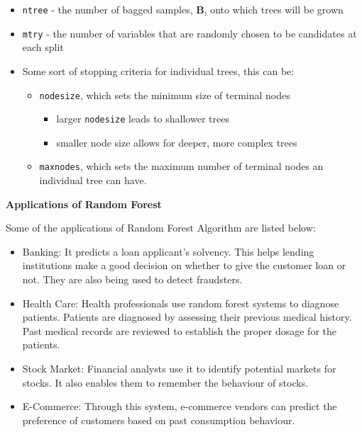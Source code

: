 \documentclass[
]{book}
\providecommand{\tightlist}{%
  \setlength{\itemsep}{0pt}\setlength{\parskip}{0pt}}
\theoremstyle{definition}
\theoremstyle{definition}
\theoremstyle{definition}
\theoremstyle{definition}
\theoremstyle{remark}
\begin{document}
\begin{itemize}
\tightlist
\item
  \texttt{ntree} - the number of bagged samples, \(\boldsymbol{B}\), onto which trees will be grown
\item
  \texttt{mtry} - the number of variables that are randomly chosen to be candidates at each split
\item
  Some sort of stopping criteria for individual trees, this can be:

  \begin{itemize}
  \tightlist
  \item
    \texttt{nodesize}, which sets the minimum size of terminal nodes

    \begin{itemize}
    \tightlist
    \item
      larger \texttt{nodesize} leads to shallower trees
    \item
      smaller node size allows for deeper, more complex trees
    \end{itemize}
  \item
    \texttt{maxnodes}, which sets the maximum number of terminal nodes an individual tree can have.
  \end{itemize}
\end{itemize}

\textbf{Applications of Random Forest}

Some of the applications of Random Forest Algorithm are listed below:

\begin{itemize}
\tightlist
\item
  Banking: It predicts a loan applicant's solvency. This helps lending institutions make a good decision on whether to give the customer loan or not. They are also being used to detect fraudsters.
\item
  Health Care: Health professionals use random forest systems to diagnose patients. Patients are diagnosed by assessing their previous medical history. Past medical records are reviewed to establish the proper dosage for the patients.
\item
  Stock Market: Financial analysts use it to identify potential markets for stocks. It also enables them to remember the behaviour of stocks.
\item
  E-Commerce: Through this system, e-commerce vendors can predict the preference of customers based on past consumption behaviour.
\end{itemize}
\end{document}
